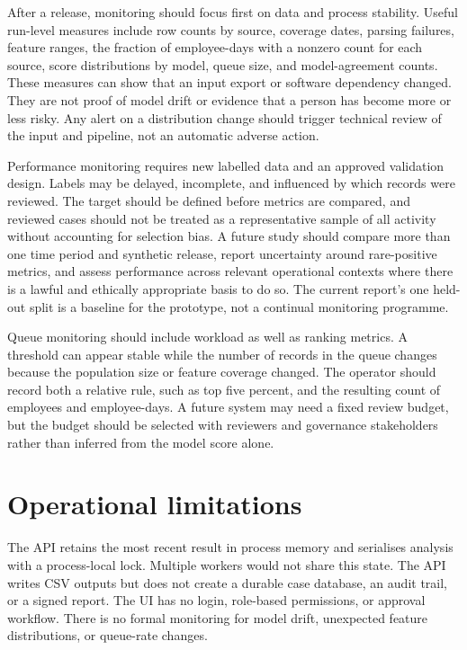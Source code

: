 After a release, monitoring should focus first on data and process
stability. Useful run-level measures include row counts by source,
coverage dates, parsing failures, feature ranges, the fraction of
employee-days with a nonzero count for each source, score distributions
by model, queue size, and model-agreement counts. These measures can
show that an input export or software dependency changed. They are not
proof of model drift or evidence that a person has become more or less
risky. Any alert on a distribution change should trigger technical
review of the input and pipeline, not an automatic adverse action.

Performance monitoring requires new labelled data and an approved
validation design. Labels may be delayed, incomplete, and influenced
by which records were reviewed. The target should be defined before
metrics are compared, and reviewed cases should not be treated as a
representative sample of all activity without accounting for selection
bias. A future study should compare more than one time period and
synthetic release, report uncertainty around rare-positive metrics,
and assess performance across relevant operational contexts where
there is a lawful and ethically appropriate basis to do so. The current
report's one held-out split is a baseline for the prototype, not a
continual monitoring programme.

Queue monitoring should include workload as well as ranking metrics.
A threshold can appear stable while the number of records in the queue
changes because the population size or feature coverage changed. The
operator should record both a relative rule, such as top five percent,
and the resulting count of employees and employee-days. A future
system may need a fixed review budget, but the budget should be selected
with reviewers and governance stakeholders rather than inferred from
the model score alone.

\section{Operational limitations}
The API retains the most recent result in process memory and serialises
analysis with a process-local lock. Multiple workers would not share
this state. The API writes CSV outputs but does not create a durable
case database, an audit trail, or a signed report. The UI has no
login, role-based permissions, or approval workflow. There is no
formal monitoring for model drift, unexpected feature distributions,
or queue-rate changes.

